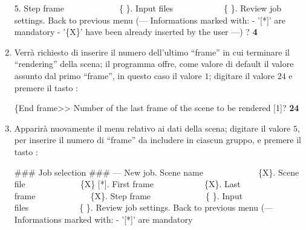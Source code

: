 \begin{enumerate}
\begin{mgCodeBox}
5. Step frame\ \ \ \ \ \ \ \ \ \ \ \ \ \{ \}. Input files\ \ \ \ \ \ \ \ \ \ \ \ \{ \}. Review job settings. Back to previous menu\newline
(---\newline
 Informations marked with:\newline
 - '[*]' are mandatory\newline
 - '\{X\}' have been already inserted by the user\newline
---)\newline
? \textbf{4}
\end{mgCodeBox}
\item Verr\`a richiesto di inserire il numero dell'ultimo ``frame'' in cui terminare il ``rendering'' della scena; il programma offre, come valore di default il valore assunto dal primo ``frame'', in questo caso il valore $1$; digitare il valore $24$ e premere il tasto :
\begin{mgCodeBox}
\small
\{End frame>> Number of the last frame of the scene to be rendered [1]? \textbf{24}
\end{mgCodeBox}
\item Apparir\`a nuovamente il menu relativo ai dati della scena; digitare il valore $5$, per inserire il numero di ``frame'' da includere in ciascun gruppo, e premere il tasto :
\begin{mgCodeBox}
\small
\#\#\# Job selection \#\#\#\newline
--- New job. Scene name\ \ \ \ \ \ \ \ \ \ \ \ \ \{X\}. Scene file\ \ \ \ \ \ \ \ \ \ \ \ \ \{X\} [*]. First frame\ \ \ \ \ \ \ \ \ \ \ \ \{X\}. Last frame\ \ \ \ \ \ \ \ \ \ \ \ \ \{X\}. Step frame\ \ \ \ \ \ \ \ \ \ \ \ \ \{ \}. Input files\ \ \ \ \ \ \ \ \ \ \ \ \{ \}. Review job settings. Back to previous menu\newline
(---\newline
 Informations marked with:\newline
 - '[*]' are mandatory\newline

\end{mgCodeBox}
\end{enumerate}
